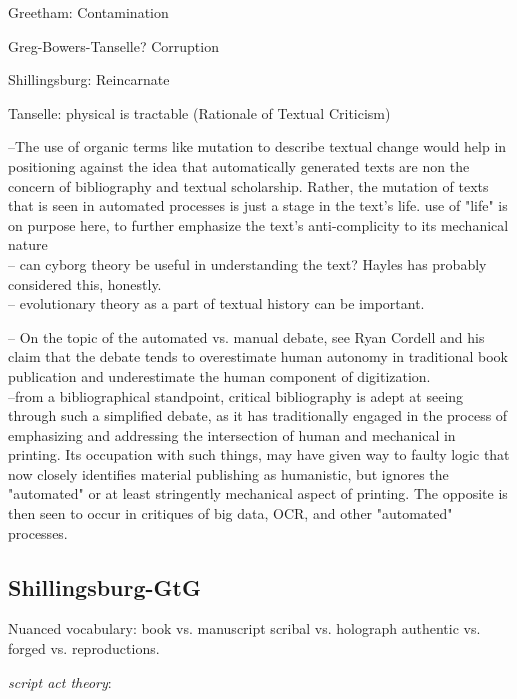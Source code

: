 \documentclass[course, english]{Notes}
\begin{document}
Greetham:
	Contamination
	
Greg-Bowers-Tanselle?
	Corruption

Shillingsburg: 
	Reincarnate

Tanselle: 
	physical is tractable (Rationale of Textual Criticism)

--{The use of organic terms like mutation to describe textual change would help in positioning against the idea that automatically generated texts are non the concern of bibliography and textual scholarship. Rather, the mutation of texts that is seen in automated processes is just a stage in the text's life.}
		 {use of "life" is on purpose here, to further emphasize the text's anti-complicity to its mechanical nature}
		\\-- {can cyborg theory be useful in understanding the text? Hayles has probably considered this, honestly.}
		\\-- {evolutionary theory as a part of textual history can be important.}
		
-- On the topic of the automated vs. manual debate, see Ryan Cordell and his claim that the debate tends to overestimate human autonomy in traditional book publication and underestimate the human component of digitization. 
\\--from a bibliographical standpoint, critical bibliography is adept at seeing through such a simplified debate, as it has traditionally engaged in the process of emphasizing and addressing the intersection of human and mechanical in printing. Its occupation with such things, may have given way to faulty logic that now closely identifies material publishing as humanistic, but ignores the "automated" or at least stringently mechanical aspect of printing. The opposite is then seen to occur in critiques of big data, OCR, and other "automated" processes. 
		
		

\subsection{Shillingsburg-GtG}
Nuanced vocabulary:
book vs. manuscript
scribal vs. holograph
authentic vs. forged vs. reproductions.

\emph{script act theory}: 
\end{document}
